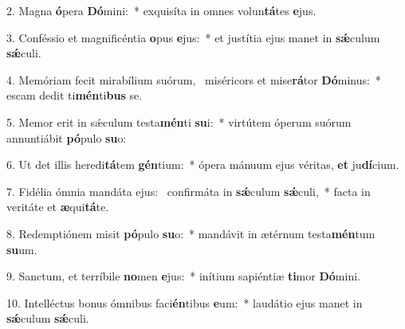 2. Magna \textbf{ó}pera \textbf{Dó}mini:~*  exquisíta in omnes volun\textbf{tá}tes \textbf{e}jus.\

3. Conféssio et magnificéntia \textbf{o}pus \textbf{e}jus:~*  et justítia ejus manet in \textbf{sǽ}culum \textbf{sǽ}culi.\

4. Memóriam fecit mirabílium suórum, \dag\  miséricors et mise\textbf{rá}tor \textbf{Dó}minus:~*  escam dedit ti\textbf{mén}ti\textbf{bus} se.\

5. Memor erit in sǽculum testa\textbf{mén}ti \textbf{su}i:~*  virtútem óperum suórum annuntiábit \textbf{pó}pulo \textbf{su}o:\

6. Ut det illis heredi\textbf{tá}tem \textbf{gén}tium:~*  ópera mánuum ejus véritas, \textbf{et} ju\textbf{dí}cium.\

7. Fidélia ómnia mandáta ejus: \dag\  confirmáta in \textbf{sǽ}culum \textbf{sǽ}culi,~*  facta in veritáte et \textbf{æ}qui\textbf{tá}te.\

8. Redemptiónem misit \textbf{pó}pulo \textbf{su}o:~*  mandávit in ætérnum testa\textbf{mén}tum \textbf{su}um.\

9. Sanctum, et terríbile \textbf{no}men \textbf{e}jus:~*  inítium sapiéntiæ \textbf{ti}mor \textbf{Dó}mini.\

10. Intelléctus bonus ómnibus faci\textbf{én}tibus \textbf{e}um:~*  laudátio ejus manet in \textbf{sǽ}culum \textbf{sǽ}culi.\

